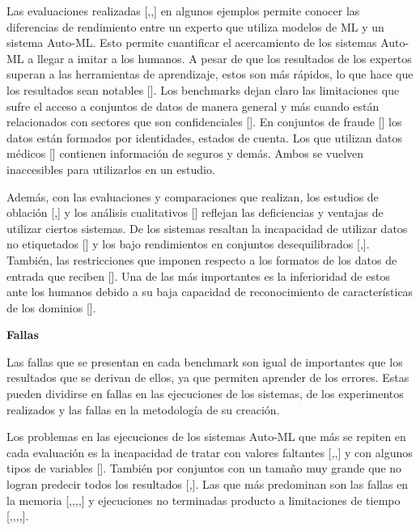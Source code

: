 Las evaluaciones realizadas [\cite{21},\cite{20},\cite{19}] en algunos ejemplos permite conocer las diferencias de rendimiento entre un experto que utiliza modelos de 
ML y un sistema Auto-ML. Esto permite cuantificar el acercamiento de los sistemas Auto-ML a llegar a imitar a los humanos. A pesar de que los resultados de los 
expertos superan a las herramientas de aprendizaje, estos son más rápidos, lo que hace que los resultados sean notables [\cite{22}]. Los benchmarks dejan claro 
las limitaciones que sufre el acceso a conjuntos de datos de manera general y más cuando están relacionados con sectores que son confidenciales [\cite{30}]. 
En conjuntos de fraude [\cite{30}] los datos están formados por identidades, estados de cuenta. Los que utilizan datos médicos [\cite{32}] contienen 
información de seguros y demás. Ambos se vuelven inaccesibles para utilizarlos en un estudio.

Además, con las evaluaciones y comparaciones que realizan, los estudios de oblación [\cite{17},\cite{29}] y los análisis cualitativos [\cite{31}] reflejan las 
deficiencias y ventajas de utilizar ciertos sistemas. De los sistemas resaltan la incapacidad de utilizar datos no etiquetados [\cite{26}] y los bajo rendimientos en 
conjuntos desequilibrados [\cite{30},\cite{32}]. También, las restricciones que imponen respecto a los formatos de los datos de entrada que reciben [\cite{27}]. 
Una de las más importantes es la inferioridad de estos ante los humanos debido a su baja capacidad de reconocimiento de características de los dominios [\cite{19}].

\begin{flushleft} 
    {\large { \textbf{Fallas}}}\label{subsection:fallas Auto-ML}
\end{flushleft}
Las fallas que se presentan en cada benchmark son igual de importantes que los resultados que se derivan de ellos, ya que permiten aprender de los errores. 
Estas pueden dividirse en fallas en las ejecuciones de los sistemas, de los experimentos realizados y las fallas en la metodología de su creación.

Los problemas en las ejecuciones de los sistemas Auto-ML que más se repiten en cada evaluación es la incapacidad de tratar con valores faltantes 
[\cite{10},\cite{32},\cite{22}] y con algunos tipos de variables [\cite{30}]. También por conjuntos con un tamaño muy grande que no logran predecir todos los resultados 
[\cite{12},\cite{22}]. Las que más predominan son las fallas en la memoria [\cite{10},\cite{11},\cite{12},\cite{29},\cite{22}] y ejecuciones no terminadas producto a limitaciones de 
tiempo [\cite{10},\cite{12},\cite{29},\cite{20},\cite{19}].

